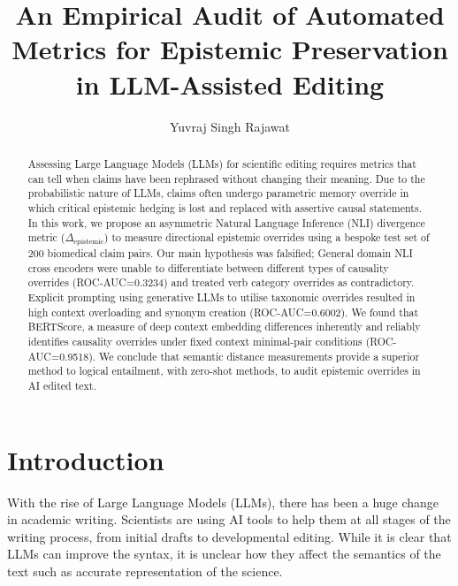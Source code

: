\documentclass[acmsmall]{acmart}
\begin{document}
\title{An Empirical Audit of Automated Metrics for Epistemic Preservation in LLM-Assisted Editing}
\author{Yuvraj Singh Rajawat}

\begin{abstract}
Assessing Large Language Models (LLMs) for scientific editing requires metrics that can tell when claims have been rephrased without changing their meaning. Due to the probabilistic nature of LLMs, claims often undergo parametric memory override in which critical epistemic hedging is lost and replaced with assertive causal statements. In this work, we propose an asymmetric Natural Language Inference (NLI) divergence metric ($\Delta_{\text{epistemic}}$) to measure directional epistemic overrides using a bespoke test set of 200 biomedical claim pairs. Our main hypothesis was falsified; General domain NLI cross encoders were unable to differentiate between different types of causality overrides (ROC-AUC=0.3234) and treated verb category overrides as contradictory. Explicit prompting using generative LLMs to utilise taxonomic overrides resulted in high context overloading and synonym creation (ROC-AUC=0.6002). We found that BERTScore, a measure of deep context embedding differences inherently and reliably identifies causality overrides under fixed context minimal-pair conditions (ROC-AUC=0.9518). We conclude that semantic distance measurements provide a superior method to logical entailment, with zero-shot methods, to audit epistemic overrides in AI edited text.
\end{abstract}

\maketitle

\section{Introduction}

With the rise of Large Language Models (LLMs), there has been a huge change in academic writing. Scientists are using AI tools to help them at all stages of the writing process, from initial drafts to developmental editing. While it is clear that LLMs can improve the syntax, it is unclear how they affect the semantics of the text such as accurate representation of the science.
 
\end{document}
